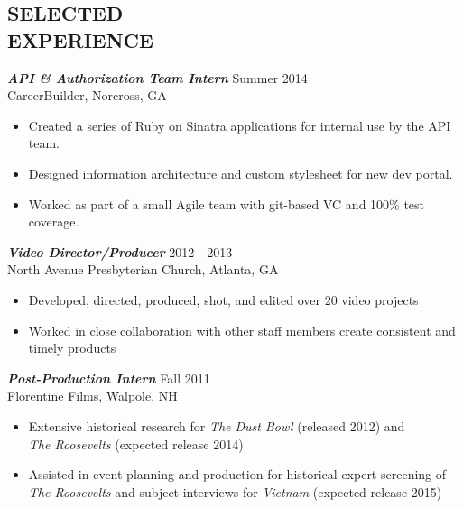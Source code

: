 \documentclass[margin]{res}
\begin{document}
\begin{resume}
\section{SELECTED \\ EXPERIENCE}
                {\sl \textbf{API \& Authorization Team Intern}} \hfill Summer 2014 \\
                    CareerBuilder, Norcross, GA
                 \begin{itemize}  \itemsep -2pt %
                 \item Created a series of Ruby on Sinatra applications for internal use by the API team.
                 \item Designed information architecture and custom stylesheet for new dev portal.
                 \item Worked as part of a small Agile team with git-based VC and 100\% test coverage.
                \end{itemize}

                {\sl \textbf{Video Director/Producer}} \hfill            2012 - 2013 \\
                 North Avenue Presbyterian Church, Atlanta, GA
                 \begin{itemize}  \itemsep -2pt %
                 \item Developed, directed, produced, shot, and edited over 20 video projects
                 \item Worked in close collaboration with other staff members create consistent and timely products
                 \end{itemize}

                {\sl \textbf{Post-Production Intern}} \hfill       Fall 2011 \\
                Florentine Films, Walpole, NH
                  \begin{itemize}  \itemsep -2pt
                   \item Extensive historical research for {\sl The Dust Bowl} (released
                   2012) and\\ {\sl The Roosevelts} (expected release 2014)
                   \item Assisted in event planning and production for historical expert
                   screening of\\ {\sl The Roosevelts} and subject interviews for {\sl Vietnam} (expected release 2015)
                   \end{itemize}


\end{resume}
\end{document}
